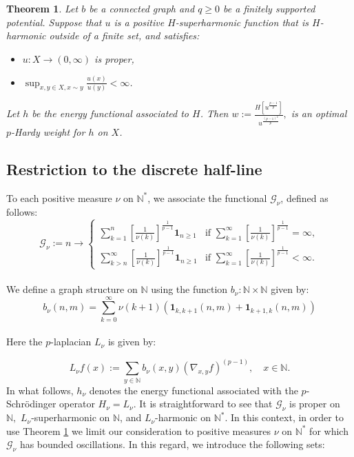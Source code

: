 \documentclass[11pt]{amsart}
\newtheorem{thm}{Theorem}[section]
\newcommand{\1}{[1]}
\begin{document}
\begin{thm} \label{thm 3.3}
Let $b$ be a connected graph and $q \geq 0$ be a finitely supported potential. Suppose that $u$ is a positive $H$-superharmonic function that is $H$-harmonic outside of a finite set, and satisfies:
\begin{itemize}
    \item[(a)] $u : X \to (0, \infty)$ is proper,
    \item[(b)] $\sup_{x, y \in X, x \sim y} \frac{u(x)}{u(y)} < \infty$.
\end{itemize}
Let $h$ be the energy functional associated to $H$. Then $ w := \frac{H [u^{\frac{p-1}{p}}]}{u^{\frac{(p-1)^2}{p}}},
$ is an optimal $p$-Hardy weight for $h$ on $X$.
\end{thm}
\phantom{.}
\subsection*{Restriction to the discrete half-line}
To each positive measure \(\nu\) on \(\mathbb{N}^{*}\), we associate the functional $\mathcal{G}_{\nu}$, defined as follows: \\
$$
\mathcal{G}_{\nu}:= n \to 
\begin{cases}
\displaystyle
\sum_{k=1}^{n} \left[ \frac{1}{\nu(k)} \right]^{\frac{1}{p-1}} \mathbf{1}_{n \geq 1} & \text{if } \displaystyle \sum_{k=1}^{\infty} \left[ \frac{1}{\nu(k)} \right]^{\frac{1}{p-1}} = \infty, \\ 
\displaystyle \sum_{k > n}^{\infty} \left[ \frac{1}{\nu(k)} \right]^{\frac{1}{p-1}} \mathbf{1}_{n \geq 1} & \text{if } \displaystyle \sum_{k=1}^{\infty} \left[ \frac{1}{\nu(k)} \right]^{\frac{1}{p-1}} < \infty. 
\end{cases}
$$
\phantom{.} \\
We define a graph structure on \(\mathbb{N}\) using the function \( b_{\nu}: \mathbb{N} \times \mathbb{N} \) given by:
$$b_{\nu}(n,m) = \sum_{k=0}^{\infty} \nu(k+1) \left(\mathbf{1}_{k,k+1}(n,m) + \mathbf{1}_{k+1,k}(n,m) \right)$$
\phantom{.} \\
Here the $p$-laplacian $L_{\nu}$ is given by:

$$L_{\nu}f(x) := \sum_{y \in \mathbb{N}} b_{\nu}(x, y) (\nabla_{x,y} f)^{(p-1)}, \quad  x \in \mathbb{N}.$$
In what follows, $h_{\nu}$ denotes the energy functional associated with the $p$-Schrödinger operator $H_{\nu} = L_{\nu}$. It is straightforward to see that \(\mathcal{G}_{\nu}\) is proper on \(\mathbb{N},\) \(L_{\nu}\)-superharmonic on \(\mathbb{N}\), and \(L_{\nu}\)-harmonic on \(\mathbb{N}^{*} \).
In this context, in order to use Theorem \ref{thm 3.3} we limit our consideration to positive measures \(\nu\) on \(\mathbb{N}^{*}\) for which \(\mathcal{G}_{\nu}\) has bounded oscillations. In this regard, 
we introduce the following sets:
\end{document}
